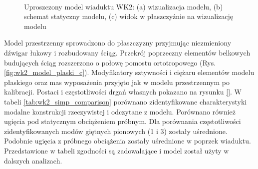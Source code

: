 \begin{figure}
	\centering
	\begin{minipage}{0.7\textwidth}
	\\
	\end{minipage}\qquad
	\begin{minipage}{0.15\textwidth}
	\end{minipage}
	\captionsetup{justification=centering}
	\caption{Uproszczony model wiaduktu WK2: (a) wizualizacja modelu, (b) schemat statyczny modelu, (c) widok w płaszczyźnie na wizualizację modelu}
	\label{fig:wk2_model_plaski}
\end{figure}



Model przestrzenny sprowadzono do płaszczyzny przyjmując niezmieniony dźwigar łukowy i rozbudowany ściąg. Przekrój poprzeczny elementów belkowych budujących ściąg rozszerzono o połowę pomostu ortotropowego (Rys. \ref{fig:wk2_model_plaski_c}). Modyfikatory sztywności i ciężaru elementów modelu płaskiego oraz mas wyposażenia przyjęto jak w modelu przestrzennym po kalibracji. Postaci i częstotliwości drgań własnych pokazano na rysunku \ref{}. W tabeli \ref{tab:wk2_simp_comparison} porównano zidentyfikowane charakterystyki modalne konstrukcji rzeczywistej i odczytane z modelu. Porównano również ugięcia pod statycznym obciążeniem próbnym. Dla porównania częstotliwości zidentyfikowanych modów giętnych pionowych (1 i 3) zostały uśrednione. Podobnie ugięcia z próbnego obciążenia zostały uśrednione w poprzek wiaduktu.
Przedstawione w tabeli zgodności są zadowalające i model został użyty w dalszych analizach.

